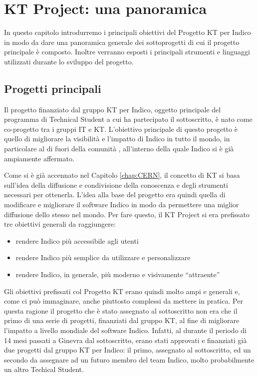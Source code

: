 \chapter{KT Project: una panoramica} \label{chap:panoramica}

	In questo capitolo introdurremo i principali obiettivi del Progetto KT per Indico in modo da dare una panoramica generale dei sottoprogetti di cui il progetto principale è composto. Inoltre verranno esposti i principali strumenti e linguaggi utilizzati durante lo sviluppo del progetto.
	
	\section{Progetti principali} \label{sec:p;progetti_principali}
    	
    	Il progetto finanziato dal gruppo \ac{KT} per Indico, oggetto principale del programma di Technical Student a cui ha partecipato il sottoscritto, è nato come co-progetto tra i gruppi \ac{IT} e \ac{KT}. L'obiettivo principale di questo progetto è quello di migliorare la visibilità e l'impatto di Indico in tutto il mondo, in particolare al di fuori della comunità , all'interno della quale Indico si è già ampiamente affermato.
    	
    	Come si è già accennato nel Capitolo \ref{chap:CERN}, il concetto di \ac{KT} si basa sull'idea della diffusione e condivisione della conoscenza e degli strumenti necessari per ottenerla. L'idea alla base del progetto era quindi quella di modificare e migliorare il software Indico in modo da permettere una miglior diffusione dello stesso nel mondo. Per fare questo, il KT Project si era prefissato tre obiettivi generali da raggiungere:
    	
    	\begin{itemize}
        	\item rendere Indico più accessibile agli utenti
        	\item rendere Indico più semplice da utilizzare e personalizzare
        	\item rendere Indico, in generale, più moderno e visivamente ``attraente''
    	\end{itemize}
    	
    	Gli obiettivi prefissati col Progetto KT erano quindi molto ampi e generali e, come ci può immaginare, anche piuttosto complessi da mettere in pratica. Per questa ragione il progetto che è stato assegnato al sottoscritto non era che il primo di una serie di progetti, finanziati dal gruppo \ac{KT}, al fine di migliorare l'impatto a livello mondiale del software Indico. Infatti, al durante il periodo di 14 mesi passati a Ginevra dal sottoscritto, erano stati approvati e finanziati già due progetti dal gruppo \ac{KT} per Indico: il primo, assegnato al sottoscritto, ed un secondo da assegnare ad un futuro membro del team Indico, molto probabilmente un altro Techical Student.
    	
